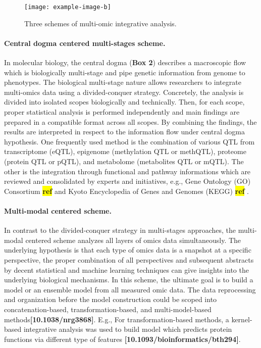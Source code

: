 \documentclass[12pt,usletter, fancy]{elegantbook}
\newcommand{\reqref}[1][ref]{
  \colorbox{yellow}{\textbf{#1}}
}
\begin{document}
\begin{figure}[h]
  \centering
  \texttt{[image: example-image-b]}
  \vspace*{0.2cm}
  \caption{Three schemes of multi-omic integrative analysis.}
  \label{fig:example-image-b}
\end{figure}

\paragraph*{Central dogma centered multi-stages scheme.}
In molecular biology, the central dogma (\textbf{Box 2}) describes a macroscopic flow which is biologically multi-stage and pipe genetic information from genome to phenotypes.
The biological multi-stage nature allows researchers to integrate multi-omics data using a divided-conquer strategy.
Concretely, the analysis is divided into isolated scopes biologically and technically.
Then, for each scope, proper statistical analysis is performed independently and main findings are prepared in a compatible format across all scopes.
By combining the findings, the results are interpreted in respect to the information flow under central dogma hypothesis.
One frequently used method is the combination of various QTL from transcriptome (eQTL), epigenome (methylation QTL or methQTL), proteome (protein QTL or pQTL), and metabolome (metabolites QTL or mQTL).
The other is the integration through functional and pathway informations which are reviewed and consolidated by experts and initiatives, e.g., Gene Ontology (GO) Consortium\reqref and Kyoto Encyclopedia of Genes and Genomes (KEGG)\reqref.

\paragraph*{Multi-modal centered scheme.}
In contrast to the divided-conquer strategy in multi-stages approaches, the multi-modal centered scheme analyzes all layers of omics data simultaneously.
The underlying hypothesis is that each type of omics data is a snapshot at a specific perspective, the proper combination of all perspectives and subsequent abstracts by decent statistical and machine learning techniques can give insights into the underlying biological mechanisms.
In this scheme, the ultimate goal is to build a model or an ensemble model from all measured omic data.
The data reprocessing and organization before the model construction could be scoped into concatenation-based, transformation-based, and multi-model-based methods\textbf{[10.1038/nrg3868]}.
E.g., For transformation-based methods, a kernel-based integrative analysis was used to build model which predicts protein functions via different type of features \textbf{[10.1093/bioinformatics/bth294]}.
\end{document}
